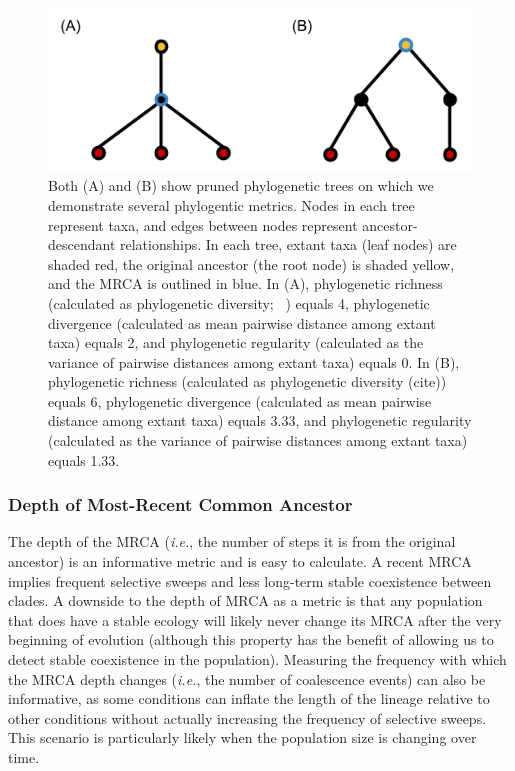 \documentclass[letterpaper]{article}
\begin{document}
\begin{figure}
    \centering
    \includegraphics[width=\linewidth]{figs/toy-phylogeny.png}
    \caption{\small Both (A) and (B) show pruned phylogenetic trees on which we demonstrate several phylogentic metrics. 
    Nodes in each tree represent taxa, and edges between nodes represent ancestor-descendant relationships.
    In each tree, extant taxa (leaf nodes) are shaded red, the original ancestor (the root node) is shaded yellow, and the MRCA is outlined in blue. In (A), phylogenetic richness (calculated as phylogenetic diversity; ~\citealp{faith_conservation_1992}) equals 4, phylogenetic divergence (calculated as mean pairwise distance among extant taxa) equals 2, and phylogenetic regularity (calculated as the variance of pairwise distances among extant taxa) equals 0. In (B), phylogenetic richness (calculated as phylogenetic diversity (cite)) equals 6, phylogenetic divergence (calculated as mean pairwise distance among extant taxa) equals 3.33, and phylogenetic regularity (calculated as the variance of pairwise distances among extant taxa) equals 1.33.}
    \label{fig:toy-phylo}
\end{figure}

\subsubsection{Depth of Most-Recent Common Ancestor}
The depth of the MRCA (\textit{i.e.}, the number of steps it is from the original ancestor) is an informative metric and is easy to calculate.
A recent MRCA implies frequent selective sweeps and less long-term stable coexistence between clades. A downside to the depth of MRCA as a metric is that any population that does have a stable ecology will likely never change its MRCA after the very beginning of evolution (although this property has the benefit of allowing us to detect stable coexistence in the population). Measuring the frequency with which the MRCA depth changes (\textit{i.e.}, the number of coalescence events) can also be informative, as some conditions can inflate the length of the lineage relative to other conditions without actually increasing the frequency of selective sweeps. This scenario is particularly likely when the population size is changing over time. 
\end{document}
